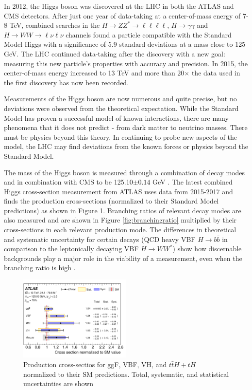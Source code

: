 In 2012, the Higgs boson was discovered at the LHC in both the ATLAS and CMS detectors. After just one year of data-taking at a center-of-mass energy of 7-8 TeV, combined searches in the $H\rightarrow ZZ^*\rightarrow \ell\ell\ell\ell$, $H\rightarrow \gamma\gamma$ and $H\rightarrow WW \rightarrow \ell\nu\ell\nu$ channels found a particle compatible with the Standard Model Higgs with a significance of 5.9 standard deviations at a mass close to 125 GeV. The LHC continued data-taking after the discovery with a new goal: measuring this new particle's properties with accuracy and precision. In 2015, the center-of-mass energy increased to 13 TeV and more than 20$\times$ the data used in the first discovery has now been recorded. 

Measurements of the Higgs boson are now numerous and quite precise, but no deviations were observed from the theoretical expectation. While the Standard Model has proven a successful model of known interactions, there are many phenomena that it does not predict - from dark matter to neutrino masses. There must be physics beyond this theory. In continuing to probe new aspects of the model, the LHC may find deviations from the known forces or physics beyond the Standard Model.

The mass of the Higgs boson is measured through a combination of decay modes and in combination with CMS to be 125.10$\pm 0.14$ GeV \cite{PDG}. The latest combined Higgs cross-section measurement from ATLAS uses data from 2015-2017 and finds the production cross-sections (normalized to their Standard Model predictions) as shown in Figure \ref{fig:productioncrosssection}. Branching ratios of relevant decay modes are also measured and are shown in Figure \ref{fig:branchingratio} multiplied by their cross-sections in each relevant production mode. The differences in theoretical and systematic uncertainty for certain decays (QCD heavy VBF $H\rightarrow b\bar{b}$ in comparison to the leptonically decaying VBF $H\rightarrow WW^*$) show how discernable backgrounds play a major role in the viability of a measurement, even when the branching ratio is high \cite{HiggsCurrent}.  
\begin{figure}[H]
        \centering
    \includegraphics[width=0.5\textwidth] {Pictures/productioncrosssection.png}\hspace{1cm}
    \caption{Production cross-sectios for ggF, VBF, VH, and $t\bar{t}H+tH$ normalized to their SM predictions. Total, systematic, and statistical uncertainties are shown \cite{HiggsCurrent}}
    \label{fig:productioncrosssection}
\end{figure}

